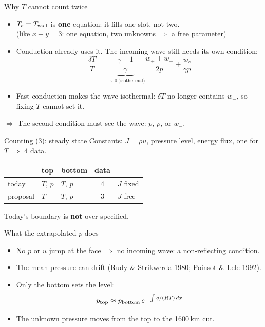 \documentclass[aspectratio=169,11pt]{beamer}
\begin{document}
\begin{frame}{Why $T$ cannot count twice}
  \begin{itemize}
    \item $T_b = T_{\rm wall}$ is \textbf{one} equation: it fills one slot, not two.
          \\[0.2em]
          (like $x+y=3$: one equation, two unknowns $\Rightarrow$ a free parameter)
    \item Conduction already uses it. The incoming wave still needs its own condition:
          \[
            \frac{\delta T}{T} = \underbrace{\frac{\gamma-1}{\gamma}}_{\to\,0\ \text{(isothermal)}}
            \frac{w_+ + w_-}{2p} + \frac{w_s}{\gamma p}
          \]
    \item Fast conduction makes the wave isothermal: $\delta T$ no longer contains $w_-$,
          so fixing $T$ cannot set it.
  \end{itemize}
  \vspace{0.4em}
  $\Rightarrow$ The second condition must see the wave: $p$, $\rho$, or $w_-$.
\end{frame}

\begin{frame}{Counting (3): steady state}
  Constants: $J=\rho u$, pressure level, energy flux, one for $T$ $\Rightarrow$ 4 data.
  \vspace{0.6em}
  \begin{center}
  \begin{tabular}{@{}l l l c l@{}}
    \toprule
    & top & bottom & data & \\
    \midrule
    today    & $T$, $p$ & $T$, $p$ & 4 & $J$ fixed \\
    proposal & $T$      & $T$, $p$ & 3 & \alert{$J$ free} \\
    \bottomrule
  \end{tabular}
  \end{center}
  \vspace{0.4em}
  Today's boundary is \textbf{not} over-specified.
\end{frame}

\begin{frame}{What the extrapolated $p$ does}
  \begin{itemize}
    \item No $p$ or $u$ jump at the face $\Rightarrow$ no incoming wave:
          a non-reflecting condition.
    \item The mean pressure can drift (Rudy \& Strikwerda 1980; Poinsot \& Lele 1992).
    \item Only the bottom sets the level:
          \[ p_{\rm top} \approx p_{\rm bottom}\,e^{-\int g/(RT)\,dx} \]
    \item The unknown pressure moves from the top to the 1600\,km cut.
  \end{itemize}
\end{frame}
\end{document}
